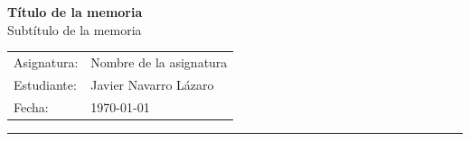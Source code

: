 \begin{titlepage}
\noindent{}
\vspace{60pt}
\textcolor{UM_Brown}{
\begin{flushleft}
    \textbf{\huge{Título de la memoria}}\\
    \vspace{30pt}
    \LARGE Subtítulo de la memoria \\
\end{flushleft}
}
\vspace{135pt}
\textcolor{UM_Brown}{
\begin{flushright}
\begin{tabular}{ll}
    Asignatura: & Nombre de la asignatura\\
    Estudiante: & Javier Navarro Lázaro\\
    Fecha: & \today
\end{tabular}
\end{flushright}
\hrule
}
\end{titlepage}


